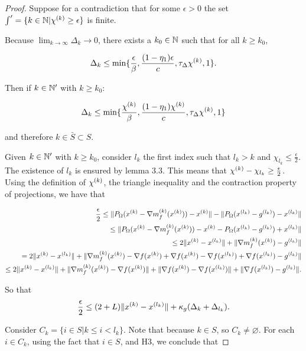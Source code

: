 \begin{proof}
Suppose for a contradiction that for some $\epsilon > 0$ the set $\int ' = \{k \in \mathbb N | {\chi^{(k)}} \ge \epsilon \}$
is finite.

Because $\lim_{k\to\infty}\Delta_k\to 0$, there exists a $k_0 \in \mathbb N$ such that for all $k \ge k_0$,

\begin{align*}
\Delta_k \le \min\{\frac{\epsilon}{\beta}, \frac{(1-\eta_1)\epsilon}{c}, \tau_{\Delta}{\chi^{(k)}}, 1\}.
\end{align*}

Then if $k \in \mathbb N '$ with $k \ge k_0$:

\begin{align*}
\Delta_k \le \min\{\frac{{\chi^{(k)}}}{\beta}, \frac{(1-\eta_1){\chi^{(k)}}}{c}, \tau_{\Delta}{\chi^{(k)}}, 1\}
\end{align*}

and therefore $k \in \bar S \subset S$.

Given $k \in \mathbb N'$ with $k\ge k_0$, consider $l_k$ the first index such that $l_k > k$ and $\chi_{l_k} \le \frac{\epsilon} 2$.
The existence of $l_k$ is ensured by lemma 3.3.
This means that ${\chi^{(k)}} - \chi_{l_k} \ge \frac {\epsilon} 2 $.
Using the definition of ${\chi^{(k)}}$, the triangle inequality and the contraction property of projections, we have that

\begin{align*}
\frac{\epsilon}{2} \le \|P_{\Omega}({x}^{(k)} - {\nabla m_f^{(k)}(x^{(k)})}) - {x}^{(k)}\| - \|P_{\Omega}(x^{(l_k)} - g^{(l_k)}) - x^{(l_k)}\| \\
\le \|P_{\Omega}({x}^{(k)} - {\nabla m_f^{(k)}(x^{(k)})}) - {x}^{(k)} - P_{\Omega}(x^{(l_k)} - g^{(l_k)}) + x^{(l_k)}\| \\
\le 2\|{x}^{(k)} - x^{(l_k)}\| + \|{\nabla m_f^{(k)}(x^{(k)})} - g^{(l_k)}\| \\
=   2\|{x}^{(k)} - x^{(l_k)}\| + \|{\nabla m_f^{(k)}(x^{(k)})} - \nabla f({x}^{(k)}) + \nabla f({x}^{(k)}) - \nabla f(x^{(l_k)}) + \nabla f(x^{(l_k)}) - g^{(l_k)}\| \\
\le 2\|{x}^{(k)} - x^{(l_k)}\| + \|{\nabla m_f^{(k)}(x^{(k)})} - \nabla f({x}^{(k)})\| + \|\nabla f({x}^{(k)}) - \nabla f(x^{(l_k)})\| + \|\nabla f(x^{(l_k)}) - g^{(l_k)}\|.
\end{align*}

So that
\begin{align}
\frac{\epsilon} 2 \le (2 + L) \|{x}^{(k)} - x^{(l_k)}\| + \kappa_{g}(\Delta_k + \Delta_{l_k}).
\end{align}

Consider $C_k = \{i \in S | k \le i < l_k\}$.
Note that because $k \in S$, so $C_k \ne \varnothing $.
For each $i \in C_k$, using the fact that $i \in S$, and H3, we conclude that 


\end{proof}
